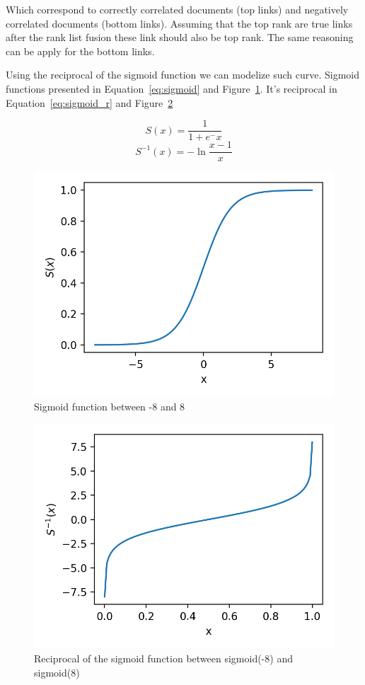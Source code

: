 Which correspond to correctly correlated documents (top links) and negatively correlated documents (bottom links).
Assuming that the top rank are true links after the rank list fusion these link should also be top rank.
The same reasoning can be apply for the bottom links.

Using the reciprocal of the sigmoid function we can modelize such curve. Sigmoid functions presented in Equation~\ref{eq:sigmoid} and Figure~\ref{fig:sigmoid}. It's reciprocal in Equation~\ref{eq:sigmoid_r} and Figure~\ref{fig:sigmoid_reciprocal}

\begin{equation}
  \label{eq:sigmoid}
  S(x) = \frac{1}{1+e^-x}
\end{equation}
\begin{equation}
  \label{eq:sigmoid_r}
  S^{-1}(x) = -\ln{\frac{x-1}{x}}
\end{equation}

\begin{figure}
  \includegraphics[width=\linewidth]{img/sigmoid.png}
  \caption{Sigmoid function between -8 and 8}
  \label{fig:sigmoid}
\end{figure}
\begin{figure}
  \includegraphics[width=\linewidth]{img/sigmoid_reciprocal.png}
  \caption{Reciprocal of the sigmoid function between sigmoid(-8) and sigmoid(8)}
  \label{fig:sigmoid_reciprocal}
\end{figure}

